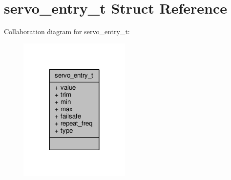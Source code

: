 \hypertarget{structservo__entry__t}{\section{servo\+\_\+entry\+\_\+t Struct Reference}
\label{structservo__entry__t}
}


Collaboration diagram for servo\+\_\+entry\+\_\+t\+:
\nopagebreak
\begin{figure}[H]
\begin{center}
\leavevmode
\includegraphics[width=156pt]{structservo__entry__t__coll__graph}
\end{center}
\end{figure}
